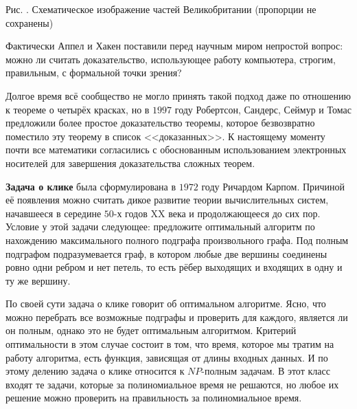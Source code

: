 \begin{paracol}{2}
\begin{center}\small Рис. \images. Схематическое изображение частей Великобритании (пропорции не сохранены)\end{center}
\end{paracol}

	Фактически Аппел и Хакен поставили перед научным миром непростой вопрос: можно ли считать доказательство, использующее работу компьютера, строгим, правильным, с формальной точки зрения? 
	
	Долгое время всё сообщество не могло принять такой подход даже по отношению к теореме о четырёх красках, но в $1997$ году Робертсон, Сандерс, Сеймур и Томас предложили более простое доказательство теоремы, которое безвозвратно поместило эту теорему в список <<доказанных>>. К настоящему моменту почти все математики согласились с обоснованным использованием электронных носителей для завершения доказательства сложных теорем.
	
	\textbf{Задача о клике} была сформулирована в $1972$ году Ричардом Карпом. Причиной её появления можно считать дикое развитие теории вычислительных систем, начавшееся в середине $50$-х годов XX века и продолжающееся до сих пор. Условие у этой задачи следующее: предложите оптимальный алгоритм по нахождению максимального полного подграфа произвольного графа. Под полным подграфом подразумевается граф, в котором любые две вершины соединены ровно одни ребром и нет петель, то есть рёбер выходящих и входящих в одну и ту же вершину.
	
	По своей сути задача о клике говорит об оптимальном алгоритме. Ясно, что можно перебрать все возможные подграфы и проверить для каждого, является ли он полным, однако это не будет оптимальным алгоритмом. Критерий оптимальности в этом случае состоит в том, что время, которое мы тратим на работу алгоритма, есть функция, зависящая от длины входных данных. И по этому делению задача о клике относится к $NP$-полным задачам. В этот класс входят те задачи, которые за полиномиальное время не решаются, но любое их решение можно проверить на правильность за полиномиальное время.
	
